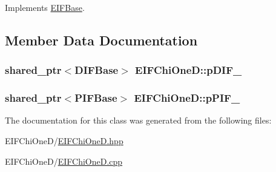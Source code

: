 Implements \hyperlink{classEIFBase_af98fe883244454497c421bc824b96188}{EIFBase}.



\subsection{Member Data Documentation}
\hypertarget{classEIFChiOneD_a8f16868a00dcf27d29ef837c73d24848}{
\subsubsection[{pDIF\_\-}]{\setlength{\rightskip}{0pt plus 5cm}shared\_\-ptr$<${\bf DIFBase}$>$ {\bf EIFChiOneD::pDIF\_\-}}}
\label{db/d1d/classEIFChiOneD_a8f16868a00dcf27d29ef837c73d24848}
\hypertarget{classEIFChiOneD_a615022d2c2b0b7bad99d4942b22f1be0}{
\subsubsection[{pPIF\_\-}]{\setlength{\rightskip}{0pt plus 5cm}shared\_\-ptr$<${\bf PIFBase}$>$ {\bf EIFChiOneD::pPIF\_\-}}}
\label{db/d1d/classEIFChiOneD_a615022d2c2b0b7bad99d4942b22f1be0}


The documentation for this class was generated from the following files:\begin{DoxyCompactItemize}
\item 
EIFChiOneD/\hyperlink{EIFChiOneD_8hpp}{EIFChiOneD.hpp}\item 
EIFChiOneD/\hyperlink{EIFChiOneD_8cpp}{EIFChiOneD.cpp}\end{DoxyCompactItemize}
